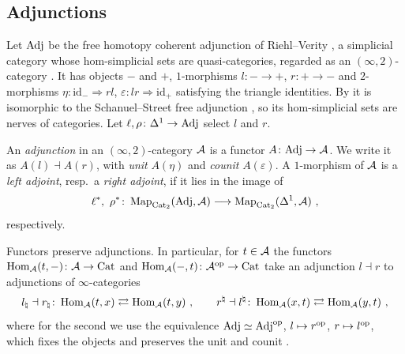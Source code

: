 \subsection{Adjunctions}
\label{subsec:prelim-adjunctions}

%
Let $\mathrm{Adj}$ be the free homotopy coherent adjunction of Riehl--Verity \cite[\S
3.1]{riehlverity2016adjunctions}, a simplicial category whose hom-simplicial
sets are quasi-categories, regarded as an $(\infty,2)$-category
\cite{haugseng2015rectification}. It has objects $-$ and $+$,
$1$-morphisms $l\colon - \to +$, $r\colon + \to -$ and $2$-morphisms
$\eta\colon \mathrm{id}_{-} \Rightarrow rl$,
$\varepsilon\colon lr \Rightarrow \mathrm{id}_{+}$
satisfying the triangle identities. By
\cite[Cor.~3.3.5]{riehlverity2016adjunctions} it is isomorphic to the
Schanuel--Street free adjunction \cite{schanuelstreet1986free},
so its hom-simplicial sets are nerves of categories. Let
$\ell,\rho\colon \Delta^{1} \to \mathrm{Adj}$
select $l$ and $r$.

\begin{defi}
\label{def:adjunction}
%
An \emph{adjunction} in an $(\infty,2)$-category $\mathcal{A}$ is a functor $A\colon \mathrm{Adj}
\to \mathcal{A}$. We write it as $A(l) \dashv A(r)$,
with \emph{unit} $A(\eta)$ and \emph{counit} $A(\varepsilon)$.
A $1$-morphism of $\mathcal{A}$ is a \emph{left adjoint}, resp.\ a \emph{right adjoint},
if it lies in the image of
\begin{equation*}
\ell^{*},\ \rho^{*}\colon \operatorname{Map}_{\mathrm{Cat}_{2}}(\mathrm{Adj},\mathcal{A}) \longrightarrow
\operatorname{Map}_{\mathrm{Cat}_{2}}(\Delta^{1},\mathcal{A}) \ ,
\end{equation*}
respectively.
\end{defi}

%
Functors preserve adjunctions. In particular, for $t \in \mathcal{A}$ the functors
$\operatorname{Hom}_{\mathcal{A}}(t,-)\colon \mathcal{A} \to \mathrm{Cat}$
and
$\operatorname{Hom}_{\mathcal{A}}(-,t)\colon \mathcal{A}^{\mathrm{op}} \to \mathrm{Cat}$
\cite{hinich2020yoneda,heine2023enriched} take an adjunction $l \dashv r$ to
adjunctions of $\infty$-categories
\begin{equation}
\label{eq:hom-adjunctions}
l_{\natural} \dashv r_{\natural}\colon \operatorname{Hom}_{\mathcal{A}}(t,x) \rightleftarrows
\operatorname{Hom}_{\mathcal{A}}(t,y) \ , \qquad r^{\natural} \dashv l^{\natural}\colon \operatorname{Hom}_{\mathcal{A}}(x,t)
\rightleftarrows \operatorname{Hom}_{\mathcal{A}}(y,t) \ ,
\end{equation}
where for the second we use the equivalence
$\mathrm{Adj} \simeq \mathrm{Adj}^{\mathrm{op}}$,
$l \mapsto r^{\mathrm{op}}$, $r \mapsto l^{\mathrm{op}}$,
which fixes the objects and preserves the unit and counit
\cite[Rem.~4.3]{haugseng2021laxmonads}.

